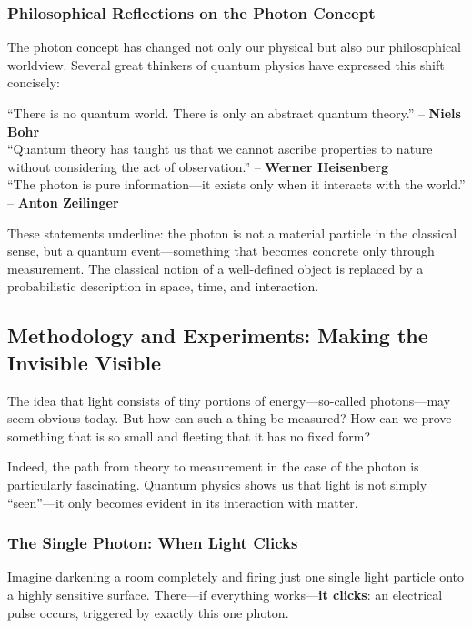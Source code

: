 \subsubsection{Philosophical Reflections on the Photon Concept}

The photon concept has changed not only our physical but also our philosophical worldview. Several great thinkers of quantum physics have expressed this shift concisely:

\begin{tcolorbox}[didaktikbox, title=What Is Reality in Quantum Physics?]
	\label{box:realitaet}
	“There is no quantum world. There is only an abstract quantum theory.” – \textbf{Niels Bohr} \cite{bohr1933} \\
	“Quantum theory has taught us that we cannot ascribe properties to nature without considering the act of observation.” – \textbf{Werner Heisenberg} \cite{heisenberg1959} \\
	“The photon is pure information—it exists only when it interacts with the world.” – \textbf{Anton Zeilinger} \cite{zeilinger2005}
\end{tcolorbox}

These statements underline: the photon is not a material particle in the classical sense, but a quantum event—something that becomes concrete only through measurement. The classical notion of a well-defined object is replaced by a probabilistic description in space, time, and interaction.
\newpage
\noindent
\subsection{Methodology and Experiments: Making the Invisible Visible}

The idea that light consists of tiny portions of energy—so-called photons—may seem obvious today. But how can such a thing be measured? How can we prove something that is so small and fleeting that it has no fixed form?

Indeed, the path from theory to measurement in the case of the photon is particularly fascinating. Quantum physics shows us that light is not simply “seen”—it only becomes evident in its interaction with matter.

\subsubsection{The Single Photon: When Light Clicks}
Imagine darkening a room completely and firing just one single light particle onto a highly sensitive surface. There—if everything works—\newline \textbf{it clicks}: an electrical pulse occurs, triggered by exactly this one photon.

